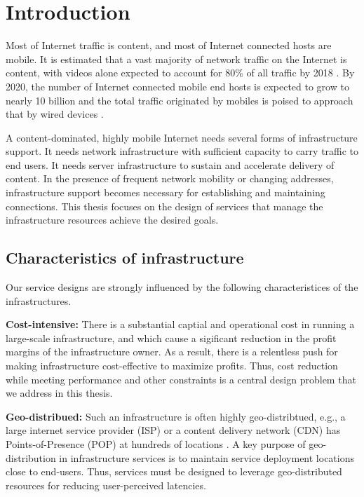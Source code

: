 \chapter{Introduction}

Most of Internet traffic is content, and most of Internet connected hosts are mobile. It is estimated that a vast majority of network traffic on the Internet is content, with videos alone expected to account for 80\% of all traffic by 2018 \cite{cisco-videogrowth}. By 2020, the number of Internet connected mobile end hosts is expected to grow to nearly 10 billion and the total traffic originated by mobiles is poised to approach that by wired devices \cite{cisco-vni}.


A content-dominated, highly mobile Internet needs several forms of infrastructure support. It needs network infrastructure with sufficient capacity to carry traffic to end users. It needs server infrastructure to sustain and accelerate delivery of content. In the presence of frequent network mobility or changing addresses, infrastructure support becomes necessary for establishing and maintaining connections. This thesis focuses on the design of services that manage the infrastructure resources achieve the desired goals.

\section{Characteristics of infrastructure}

Our service designs are strongly influenced by the following characteristices of the infrastructures.

\textbf{Cost-intensive:} There is a substantial captial and operational cost in running a large-scale infrastructure\cite{greenberg2008cost}, and which cause a sigificant reduction in the profit margins of the infrastructure owner\cite{isp-low-profit}. As a result, there is a relentless push for making infrastructure cost-effective to maximize profits. 
Thus, cost reduction while meeting performance and other constraints is a central design problem that we address in this thesis. 

\textbf{Geo-distribued:} Such an infrastructure is often highly geo-distribtued, e.g., a large internet service provider (ISP) or a content delivery network (CDN) has Points-of-Presence (POP) at hundreds of locations \cite{dilley2002globally}. A key purpose of geo-distribution in infrastructure services is to maintain service deployment locations close to end-users. Thus, services must be designed to leverage geo-distributed resources for reducing user-perceived latencies.

